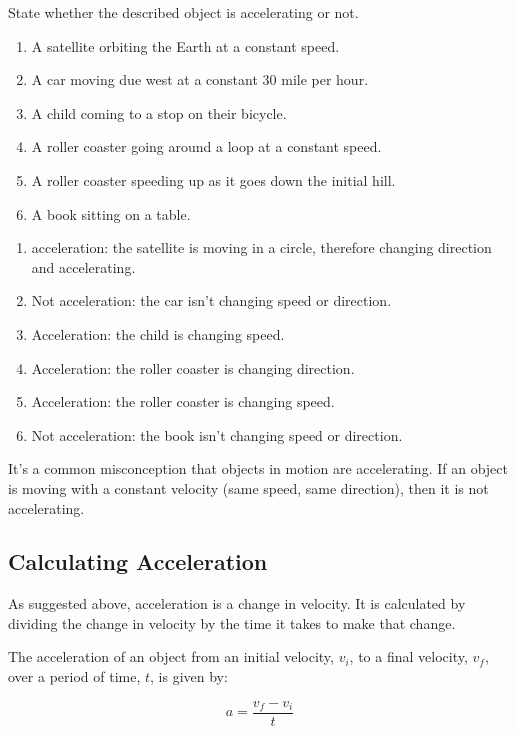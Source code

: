 \begin{Exercise}[title = {Is it accelerating?}, label = accel]
State whether the described object is accelerating or not. 
\begin{enumerate}
\item A satellite orbiting the Earth at a constant speed.
\item A car moving due west at a constant 30 mile per hour.
\item A child coming to a stop on their bicycle.
\item A roller coaster going around a loop at a constant speed.
\item A roller coaster speeding up as it goes down the initial hill.
\item A book sitting on a table. 
\end{enumerate}
\end{Exercise}

\begin{Answer}[ref = accel]
\begin{enumerate}
\item acceleration: the satellite is moving in a circle, therefore changing direction and accelerating.
\item Not acceleration: the car isn't changing speed or direction.
\item Acceleration: the child is changing speed.
\item Acceleration: the roller coaster is changing direction.
\item Acceleration: the roller coaster is changing speed. 
\item Not acceleration: the book isn't changing speed or direction.
\end{enumerate}
\end{Answer}

It's a common misconception that objects in motion are accelerating. If an object is moving with a constant velocity (same speed, same direction), then it is not accelerating. 

\subsection{Calculating Acceleration}
As suggested above, acceleration is a change in velocity. It is calculated by
dividing the change in velocity by the time it takes to make that change.

\begin{mdframed}[style = important, frametitle = {Calculating Acceleration}]
The acceleration of an object from an initial velocity, $v_i$, to a final
velocity, $v_f$, over a period of time, $t$, is given by:

$$a = \frac{v_f - v_i}{t}$$
\end{mdframed}

